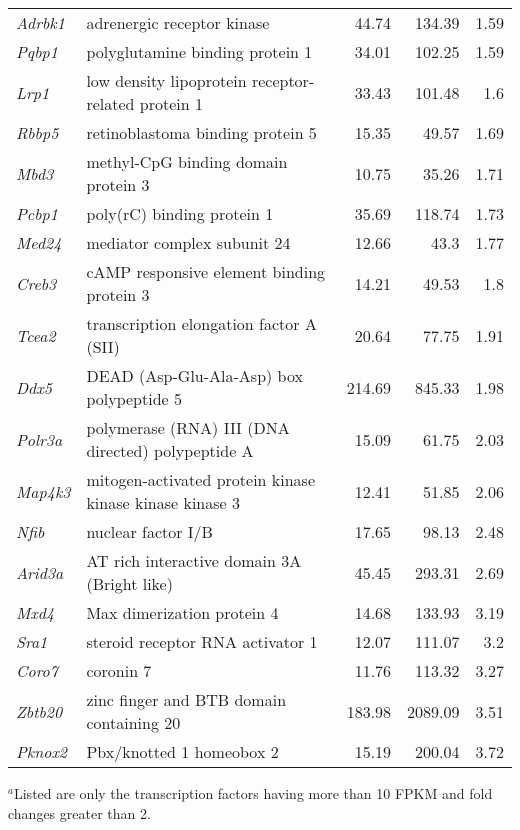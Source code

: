 \documentclass{article}
\begin{document}
\begin{table}
\begin{small}
\begin{tabular}{l p{2.5in }rrr}
{\it  Adrbk1 }& adrenergic receptor kinase &44.74&134.39&1.59 \\
{\it  Pqbp1 }& polyglutamine binding protein 1 &34.01&102.25&1.59 \\
{\it  Lrp1 }& low density lipoprotein receptor-related protein 1 &33.43&101.48&1.6 \\
{\it  Rbbp5 }& retinoblastoma binding protein 5 &15.35&49.57&1.69 \\
{\it  Mbd3 }& methyl-CpG binding domain protein 3 &10.75&35.26&1.71 \\
{\it  Pcbp1 }& poly(rC) binding protein 1 &35.69&118.74&1.73 \\
{\it  Med24 }& mediator complex subunit 24 &12.66&43.3&1.77 \\
{\it  Creb3 }& cAMP responsive element binding protein 3 &14.21&49.53&1.8 \\
{\it  Tcea2 }& transcription elongation factor A (SII) &20.64&77.75&1.91 \\
{\it  Ddx5 }& DEAD (Asp-Glu-Ala-Asp) box polypeptide 5 &214.69&845.33&1.98 \\
{\it  Polr3a }& polymerase (RNA) III (DNA directed) polypeptide A &15.09&61.75&2.03 \\
{\it  Map4k3 }& mitogen-activated protein kinase kinase kinase kinase 3 &12.41&51.85&2.06 \\
{\it  Nfib }& nuclear factor I/B &17.65&98.13&2.48 \\
{\it  Arid3a }& AT rich interactive domain 3A (Bright like) &45.45&293.31&2.69 \\
{\it  Mxd4 }& Max dimerization protein 4 &14.68&133.93&3.19 \\
{\it  Sra1 }& steroid receptor RNA activator 1 &12.07&111.07&3.2 \\
{\it  Coro7 }& coronin 7 &11.76&113.32&3.27 \\
{\it  Zbtb20 }& zinc finger and BTB domain containing 20 &183.98&2089.09&3.51 \\
{\it  Pknox2 }& Pbx/knotted 1 homeobox 2 &15.19&200.04&3.72 \\ 
   \hline
\end{tabular}
$^a$Listed are only the transcription factors having more than 10 FPKM and fold changes greater than 2.
\end{small}
\label{tab:TFs2}
\end{table}

\end{document}
